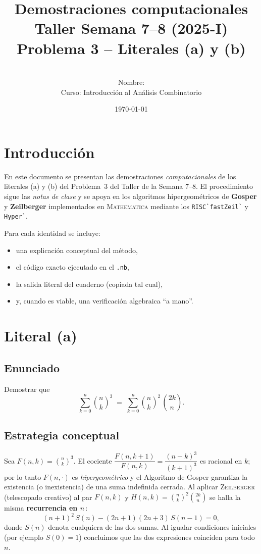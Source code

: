 \documentclass[12pt]{article}
\title{Demostraciones computacionales \\
Taller Semana 7--8 (2025-I) \\
Problema 3 -- Literales (a) y (b)}
\author{\\[1ex]Nombre: \underline{\hspace{4cm}} \\
Curso: Introducción al Análisis Combinatorio}
\date{\today}
\begin{document}
\maketitle
\pagestyle{plain}

\section*{Introducción}
En este documento se presentan las demostraciones \textit{computacionales} de los literales (a) y (b) del
Problema~3 del Taller de la Semana 7--8.  
El procedimiento sigue las \emph{notas de clase} y se apoya en los algoritmos hipergeométricos de
\textbf{Gosper} y \textbf{Zeilberger} implementados en \textsc{Mathematica} mediante los \verb|RISC`fastZeil`|
y \verb|Hyper`|.

Para cada identidad se incluye:
\begin{itemize}
  \item una explicación conceptual del método,
  \item el código exacto ejecutado en el \texttt{.nb},
  \item la salida literal del cuaderno (copiada tal cual),
  \item y, cuando es viable, una verificación algebraica ``a mano''.
\end{itemize}

\section{Literal (a)}
\subsection*{Enunciado}
Demostrar que
\[
  \sum_{k=0}^{n} \binom{n}{k}^{3}
  \;=\;
  \sum_{k=0}^{n} \binom{n}{k}^{2}\,\binom{2k}{n}.
\]

\subsection*{Estrategia conceptual}
Sea
\(F(n,k)=\binom{n}{k}^{3}\).
El cociente
\(
  \dfrac{F(n,k+1)}{F(n,k)}
  =\dfrac{(n-k)^{3}}{(k+1)^{3}}
\)
es racional en \(k\); por lo tanto \(F(n,\cdot)\) es \emph{hipergeométrico} y el
Algoritmo de Gosper garantiza la existencia (o inexistencia) de una suma
indefinida cerrada.
Al aplicar \textsc{Zeilberger} (telescopado creativo) al par
\(F(n,k)\) y
\(H(n,k)=\binom{n}{k}^{2}\binom{2k}{n}\)
se halla la misma \textbf{recurrencia en \(n\)}\,:
\[
  (n+1)^{2}\,S(n) - (2n+1)(2n+3)\,S(n-1)=0,
\]
donde \(S(n)\) denota cualquiera de las dos sumas.  
Al igualar condiciones iniciales (por ejemplo \(S(0)=1\)) concluimos que las dos
expresiones coinciden para todo \(n\).
\end{document}
